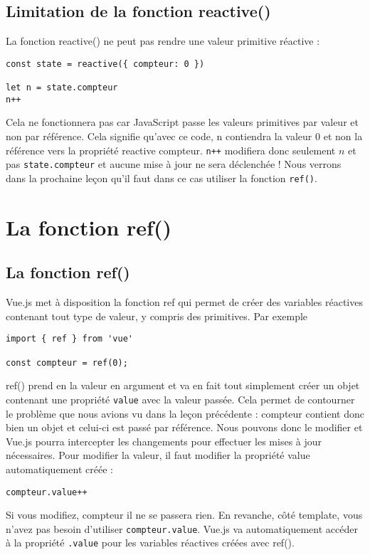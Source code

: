 \subsection{Limitation de la fonction {\color{monOrange}reactive()}}
La fonction {\color{monOrange}reactive()} ne peut pas rendre une valeur primitive réactive :
\begin{verbatim}
const state = reactive({ compteur: 0 })

let n = state.compteur
n++
\end{verbatim}

Cela ne fonctionnera pas car JavaScript passe les valeurs primitives par valeur et non par référence. Cela signifie qu'avec ce code, n contiendra la valeur 0 et non la référence vers la propriété {\color{monOrange}reactive compteur}. {\tt n++} modifiera donc seulement $n$ et pas {\tt state.compteur} et aucune mise à jour ne sera déclenchée ! Nous verrons dans la prochaine leçon qu'il faut dans ce cas utiliser la fonction {\tt ref()}.


\section{La fonction ref()}
\subsection{La fonction ref()}
{\color{monOrange}Vue.js} met à disposition la fonction {\color{monOrange}ref} qui permet de créer des variables réactives contenant tout type de valeur, y compris des primitives. Par exemple
\begin{verbatim}
import { ref } from 'vue'

const compteur = ref(0);
\end{verbatim}
{\color{monOrange}ref()} prend en la valeur en argument et va en fait tout simplement créer un objet contenant une propriété {\tt value} avec la valeur passée. Cela permet de contourner le problème que nous avions vu dans la leçon précédente : compteur contient donc bien un objet et celui-ci est passé par référence. Nous pouvons donc le modifier et {\color{monOrange}Vue.js} pourra intercepter les changements pour effectuer les mises à jour nécessaires. Pour modifier la valeur, il faut modifier la propriété value automatiquement créée :
\begin{verbatim}
compteur.value++
\end{verbatim}
Si vous modifiez, compteur il ne se passera rien. En revanche, côté {\color{monOrange}template}, vous n'avez pas besoin d'utiliser {\tt compteur.value}. {\color{monOrange}Vue.js} va automatiquement accéder à la propriété {\tt .value} pour les variables réactives créées avec {\color{monOrange}ref()}.


